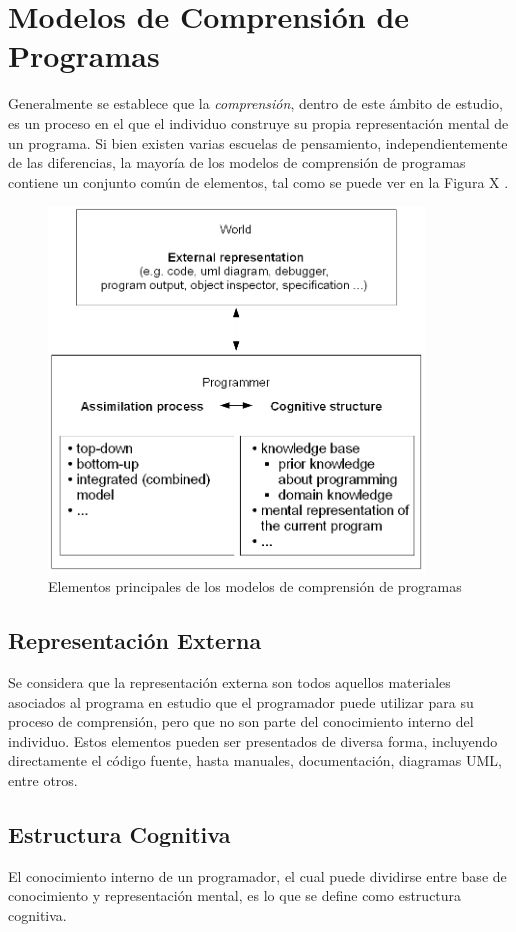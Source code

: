 \section{Modelos de Comprensión de Programas}

Generalmente se establece que la \textit{comprensión}, dentro de este ámbito de estudio, es un
proceso en el que el individuo construye su propia representación mental de un programa.
Si bien existen varias escuelas de pensamiento, independientemente de las diferencias, la
mayoría de los modelos de comprensión de programas contiene un conjunto común de elementos,
tal como se puede ver en la Figura X \cite{SchulteClear10}.

\begin{figure}[H]
    \includegraphics[width=10cm]{program_comprehension/elements.png}
    \centering
    \caption{Elementos principales de los modelos de comprensión de programas}
\end{figure}

\subsection{Representación Externa}
Se considera que la representación externa son todos aquellos materiales asociados al programa
en estudio que el programador puede utilizar para su proceso de comprensión, pero que no son 
parte del conocimiento interno del individuo.
Estos elementos pueden ser presentados de diversa forma, incluyendo directamente el código fuente,
hasta manuales, documentación, diagramas UML, entre otros.

\subsection{Estructura Cognitiva}
El conocimiento interno de un programador, el cual puede dividirse entre base de conocimiento
y representación mental, es lo que se define como estructura cognitiva.


